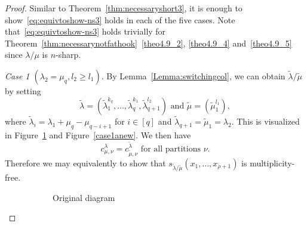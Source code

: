 \documentclass[ALCO,ThmDefs,Unicode,epreuves]{cedram}
\newenvironment{Case}[1]{\par\vskip2pt\noindent%
\emph{#1}.}{\vskip2pt}
\begin{document}
\begin{proof}
Similar to Theorem~\ref{thm:necessaryshort3}, it is enough to show~\eqref{eq:equivtoshow-ns3} holds in each of the five cases. Note that~\eqref{eq:equivtoshow-ns3} holds trivially for Theorem~\ref{thm:necessarynotfathook}~\ref{theo4.9_2}, \ref{theo4.9_4} and~\ref{theo4.9_5} since $\lambda/\mu$ is $n$-sharp. 

\begin{Case}
{Case 1 $(\lambda_2 = \mu_q, l_2\geq l_1)$} 
By Lemma~\ref{Lemma:switchingcol}, we can obtain $\tilde\lambda/\tilde\mu$ by setting
\[
\tilde\lambda = (\tilde\lambda_1^{k_q}, \ldots,\tilde\lambda_q^{k_1},\tilde\lambda_{q+1}^{l_2})\text{ and }\tilde\mu = (\tilde\mu_1^{l_1}),
\]
where $\tilde\lambda_i = \lambda_1+\mu_q-\mu_{q-i+1}$ for $i\in [q]$ and $\tilde\lambda_{q+1} = \tilde\mu_1 = \lambda_2$. This is visualized in Figure~\ref{case1aoriginal} and Figure~\ref{case1anew}. We then have
\[
c^{\lambda}_{\mu,\nu} = c^{\tilde\lambda}_{\tilde\mu,\nu}\text{ for all partitions }\nu.
\]
Therefore we may equivalently to show that $s_{\tilde\lambda/\tilde\mu}(x_1,\ldots,x_{\rho+1})$ is multiplicity-free.

\begin{figure}[htb]\centering
 \begin{subfigure}{0.4\textwidth}
 \caption{Original diagram}
 \label{case1aoriginal}
 \end{subfigure}
 \hspace{1cm}
 \begin{subfigure}{0.47\textwidth}
\end{subfigure}
\end{figure}
\end{Case}
\end{proof}
\end{document}
